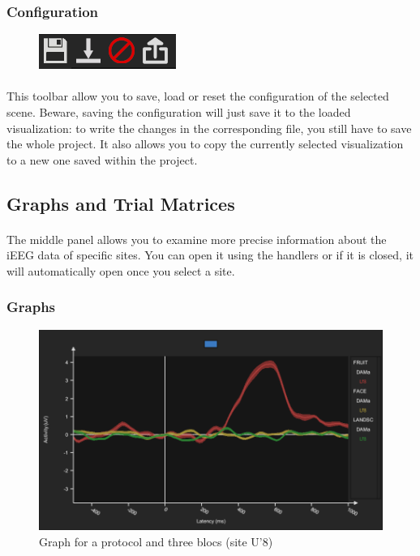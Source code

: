 \documentclass[a4paper]{article}
\begin{document}
\subsubsection{Configuration}
\begin{figure}[H]
\begin{center}
\includegraphics[scale=0.5]{Configuration.png}
\end{center}
\end{figure}
\paragraph{} This toolbar allow you to save, load or reset the configuration of the selected scene. Beware, saving the configuration will just save it to the loaded visualization: to write the changes in the corresponding file, you still have to save the whole project. It also allows you to copy the currently selected visualization to a new one saved within the project.
\subsection{Graphs and Trial Matrices}\label{graphs}
\paragraph{} The middle panel allows you to examine more precise information about the iEEG data of specific sites. You can open it using the handlers or if it is closed, it will automatically open once you select a site.
\subsubsection{Graphs}
\begin{figure}[H]
\begin{center}
\includegraphics[scale=0.35]{Graph.png}
\end{center}
\caption{\label{graph}Graph for a protocol and three blocs (site U'8)}
\end{figure}
\end{document}
